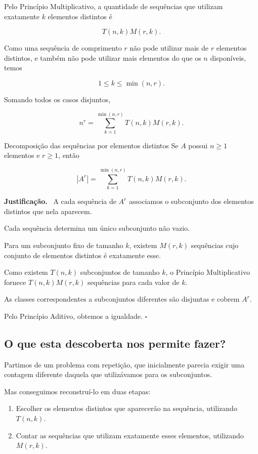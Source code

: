 \documentclass[11pt,a4paper,oneside]{book}
\newcommand{\prova}{\textbf{Justificação.}\ }
\newcommand{\fimprova}{\hfill$\square$}
\begin{document}
Pelo Princípio Multiplicativo, a quantidade
de sequências que utilizam exatamente
$k$ elementos distintos é

\[
T(n,k)M(r,k).
\]

Como uma sequência de comprimento $r$
não pode utilizar mais de $r$ elementos
distintos, e também não pode utilizar mais
elementos do que os $n$ disponíveis,
temos

\[
1\leq k\leq\min(n,r).
\]

Somando todos os casos disjuntos,

\[
\boxed{
n^r=
\sum_{k=1}^{\min(n,r)}
T(n,k)M(r,k)
}.
\]

\begin{teoremabox}{Decomposição das sequências por elementos distintos}
Se $A$ possui $n\geq1$ elementos e $r\geq1$,
então

\[
\boxed{
|A^r|=
\sum_{k=1}^{\min(n,r)}
T(n,k)M(r,k)
}.
\]

\prova
A cada sequência de $A^r$ associamos
o subconjunto dos elementos distintos
que nela aparecem.

Cada sequência determina um único
subconjunto não vazio.

Para um subconjunto fixo de tamanho $k$,
existem $M(r,k)$ sequências cujo conjunto
de elementos distintos é exatamente esse.

Como existem $T(n,k)$ subconjuntos
de tamanho $k$, o Princípio Multiplicativo
fornece $T(n,k)M(r,k)$ sequências
para cada valor de $k$.

As classes correspondentes a subconjuntos
diferentes são disjuntas e cobrem $A^r$.

Pelo Princípio Aditivo, obtemos a igualdade.
\fimprova
\end{teoremabox}

\subsection*{O que esta descoberta nos permite fazer?}

Partimos de um problema com repetição,
que inicialmente parecia exigir uma
contagem diferente daquela que utilizávamos
para os subconjuntos.

Mas conseguimos reconstruí-lo em duas etapas:

\begin{enumerate}
\item Escolher os elementos distintos que
aparecerão na sequência, utilizando $T(n,k)$.

\item Contar as sequências que utilizam
exatamente esses elementos, utilizando $M(r,k)$.
\end{enumerate}
\end{document}
